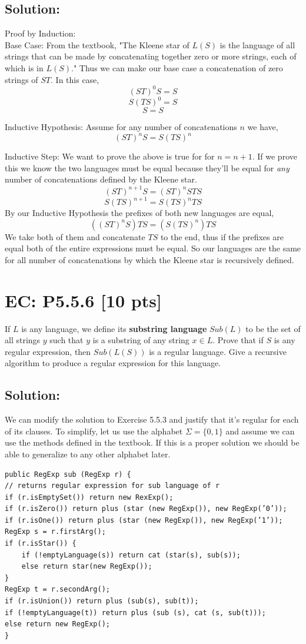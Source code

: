 \documentclass[12pt]{article}
\begin{document}
\subsection*{\textbf{Solution:}}
Proof by Induction:\\

Base Case: From the textbook, "The Kleene star of $L(S)$ is the language of all strings that can be made by concatenating together zero or more strings, each of which is in $L(S)$." Thus we can make our base case a concatenation of zero strings of $ST$. In this case,
\[ (ST)^0S = S \]
\[ S(TS)^0 = S \]
\[ S = S \]

Inductive Hypothesis: Assume for any number of concatenations $n$ we have,
\[ (ST)^nS = S(TS)^n \]

Inductive Step: We want to prove the above is true for for $n = n + 1$. If we prove this we know the two languages must be equal because they'll be equal for \textit{any} number of concatenations defined by the Kleene star.
\[ (ST)^{n+1}S = (ST)^nSTS\]
\[ S(TS)^{n+1} = S(TS)^nTS\]
By our Inductive Hypothesis the prefixes of both new languages are equal,
\[ ((ST)^nS)TS = (S(TS)^n)TS\]
We take both of them and concatenate $TS$ to the end, thus if the prefixes are equal both of the entire expressions must be equal. So our languages are the same for all number of concatenations by which the Kleene star is recursively defined.


\newpage
\section*{\textbf{EC: P5.5.6} [10 pts]}
If $L$ is any language, we define its \textbf{substring language} $Sub(L)$ to be the set of all strings $y$ such that $y$ is a substring of any string $x \in L$. Prove that if $S$ is any regular expression, then $Sub(L(S))$ is a regular language. Give a recursive algorithm to produce a regular expression for this language.

\subsection*{\textbf{Solution:}}
We can modify the solution to Exercise 5.5.3 and justify that it's regular for each of its clauses. To simplify, let us use the alphabet $\Sigma = \{0,1\}$ and assume we can use the methods defined in the textbook. If this is a proper solution we should be able to generalize to any other alphabet later.

\begin{verbatim}
public RegExp sub (RegExp r) {
// returns regular expression for sub language of r 
if (r.isEmptySet()) return new RexExp();
if (r.isZero()) return plus (star (new RegExp()), new RegExp(’0’));
if (r.isOne()) return plus (star (new RegExp()), new RegExp(’1’));
RegExp s = r.firstArg();
if (r.isStar()) {
	if (!emptyLanguage(s)) return cat (star(s), sub(s));
	else return star(new RegExp());
}
RegExp t = r.secondArg();
if (r.isUnion()) return plus (sub(s), sub(t));
if (!emptyLanguage(t)) return plus (sub (s), cat (s, sub(t)));
else return new RegExp();
}
\end{verbatim}
\end{document}
